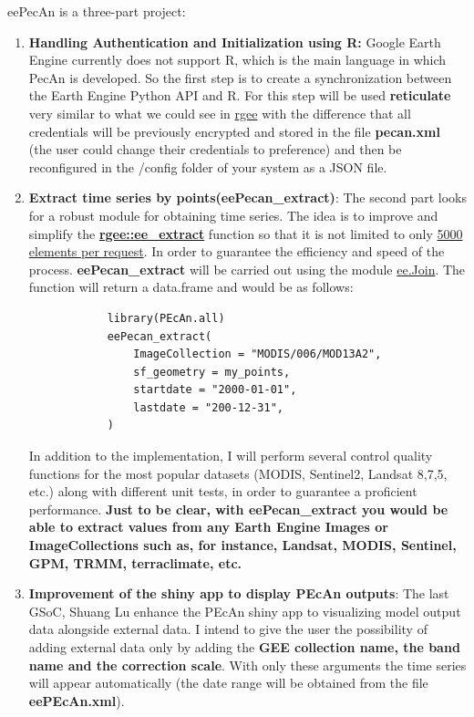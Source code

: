\documentclass{eepecan}
\begin{document}
	\noindent eePecAn is a three-part project:
	
	
	\begin{enumerate}
		\item \textbf{Handling Authentication and Initialization using R:} Google Earth Engine currently does not support R, which is the main language in which PecAn is developed.  So the first step is to create a synchronization between the Earth Engine Python API and R. For this step will be used \textbf{reticulate} very similar to what we could see in
		\href{https://github.com/csaybar/rgee}{rgee} with the difference that all credentials will be previously encrypted and stored in the file \textbf{pecan.xml} (the user could change their credentials to preference) and then be reconfigured in the /config folder of your system as a JSON file.
		
		\item \textbf{Extract time series by points(eePecan\_extract)}: The second part looks for a robust module for obtaining time series. The idea is to improve and simplify the \textbf{ \href{https://csaybar.github.io/rgee/reference/ee_extract.html}{rgee::ee\_extract}} function so that it is not limited to only \href{https://developers.google.com/earth-engine/ic_info}{5000 elements per request}. In order to guarantee the efficiency and speed of the process. \textbf{eePecan\_extract} will be carried out using the module \href{https://developers.google.com/earth-engine/joins_intro}{ee.Join}. The function will return a data.frame and would be as follows:
		
		\begin{lstlisting}
			library(PEcAn.all)
			eePecan_extract(
				ImageCollection = "MODIS/006/MOD13A2",
				sf_geometry = my_points,
				startdate = "2000-01-01",
				lastdate = "200-12-31",
			)
		\end{lstlisting}
		
		In addition to the implementation, I will perform  several control quality functions for the most popular datasets (MODIS, Sentinel2, Landsat 8,7,5, etc.) along with different unit tests, in order to guarantee a proficient performance. \textbf{Just to be clear, with eePecan\_extract you would be able to extract values from any Earth Engine Images or ImageCollections such as, for instance, Landsat, MODIS, Sentinel, GPM, TRMM, terraclimate, etc.}
		
		
		\item {\textbf{Improvement of the shiny app to display PEcAn outputs}}: The last GSoC, Shuang Lu enhance the PEcAn shiny app to visualizing model output data alongside external data. I intend to give the user the possibility of adding external data only by adding the \textbf{GEE collection name, the band name and the correction scale}. With only these arguments the time series will appear automatically (the date range will be obtained from the file \textbf{eePEcAn.xml}).
		

\end{enumerate}
\end{document}
